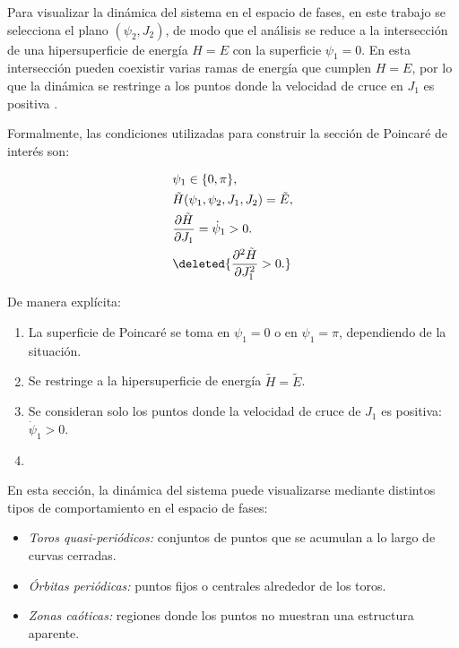 Para visualizar la dinámica del sistema en el espacio de fases, en este trabajo se selecciona el plano
\((\psi_2, J_2)\), de modo que el análisis se reduce a la intersección de una hipersuperficie de energía \(H = E\)
con la superficie \(\psi_1 = 0\). En esta intersección pueden coexistir varias ramas de energía que cumplen
\(H = E\), por lo que la dinámica se restringe a los puntos donde la velocidad de cruce en \(J_1\) es positiva
 \cite{mossmann2006semiclassical}.

Formalmente, las condiciones utilizadas para construir la sección de Poincaré de interés son:

\begin{equation}
    \begin{aligned}
         & \psi_1 \in \{0, \pi\},                                      \\
         & \tilde{H}(\psi_1, \psi_2, J_1, J_2) = \tilde{E},            \\
         & \frac{\partial \tilde{H}}{\partial J_1} = \dot{\psi}_1 > 0. \\
         & \deleted{ \frac{\partial^2 \tilde{H}}{\partial J_1^2} > 0.}
    \end{aligned}
\end{equation}

De manera explícita:
\begin{enumerate}
    \item La superficie de Poincaré se toma en \(\psi_1 = 0\) o en \(\psi_1 = \pi\), dependiendo de la situación.
    \item Se restringe a la hipersuperficie de energía \(\tilde{H} = \tilde{E}\).
    \item Se consideran solo los puntos donde la velocidad de cruce de \(J_1\) es positiva: \(\dot{\psi}_1 > 0\).
    \item {}
\end{enumerate}

En esta sección, la dinámica del sistema puede visualizarse mediante distintos tipos de comportamiento en el espacio de fases:

\begin{itemize}
    \item \emph{Toros quasi-periódicos:} conjuntos de puntos que se acumulan a lo largo de curvas cerradas.
    \item \emph{Órbitas periódicas:} puntos fijos o centrales alrededor de los toros.
    \item \emph{Zonas caóticas:} regiones donde los puntos no muestran una estructura aparente.
\end{itemize}

